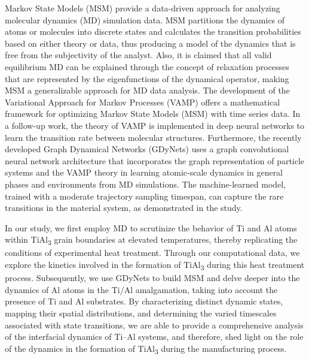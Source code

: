 Markov State Models (MSM) provide a data-driven approach for analyzing molecular dynamics (MD) simulation data.\cite{hinrichs2007calculation,pande2010everything,husic2018markov} MSM partitions the dynamics of atoms or molecules into discrete states and calculates the transition probabilities based on either theory or data, thus producing a model of the dynamics that is free from the subjectivity of the analyst.\cite{prinz2011markov} Also, it is claimed that all valid equilibrium MD can be explained through the concept of relaxation processes that are represented by the eigenfunctions of the dynamical operator, making MSM a generalizable approach for MD data analysis.\cite{prinz2011markov} The development of the Variational Approach for Markov Processes (VAMP) offers a mathematical framework for optimizing Markov State Models (MSM) with time series data.\cite{wu2017variational,wu2020variational} In a follow-up work, the theory of VAMP is implemented in deep neural networks to learn the transition rate between molecular structures.\cite{mardt2018vampnets} Furthermore, the recently developed Graph Dynamical Networks (GDyNets) uses a graph convolutional neural network architecture that incorporates the graph representation of particle systems and the VAMP theory in learning atomic-scale dynamics in general phases and environments from MD simulations.\cite{xie2019graph} The machine-learned model, trained with a moderate trajectory sampling timespan, can capture the rare transitions in the material system, as demonstrated in the study.\cite{xie2019graph}

In our study, we first employ MD to scrutinize the behavior of Ti and Al atoms within TiAl\textsubscript{3} grain boundaries at elevated temperatures, thereby replicating the conditions of experimental heat treatment. Through our computational data, we explore the kinetics involved in the formation of TiAl\textsubscript{3} during this heat treatment process. Subsequently, we use GDyNets to build MSM and delve deeper into the dynamics of Al atoms in the Ti/Al amalgamation, taking into account the presence of Ti and Al substrates. By characterizing distinct dynamic states, mapping their spatial distributions, and determining the varied timescales associated with state transitions, we are able to provide a comprehensive analysis of the interfacial dynamics of Ti--Al systems, and therefore, shed light on the role of the dynamics in the formation of TiAl\textsubscript{3} during the manufacturing process.